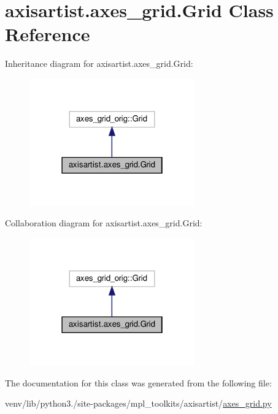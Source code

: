 \hypertarget{classaxisartist_1_1axes__grid_1_1Grid}{}\section{axisartist.\+axes\+\_\+grid.\+Grid Class Reference}
\label{classaxisartist_1_1axes__grid_1_1Grid}


Inheritance diagram for axisartist.\+axes\+\_\+grid.\+Grid\+:
\nopagebreak
\begin{figure}[H]
\begin{center}
\leavevmode
\includegraphics[width=202pt]{classaxisartist_1_1axes__grid_1_1Grid__inherit__graph}
\end{center}
\end{figure}


Collaboration diagram for axisartist.\+axes\+\_\+grid.\+Grid\+:
\nopagebreak
\begin{figure}[H]
\begin{center}
\leavevmode
\includegraphics[width=202pt]{classaxisartist_1_1axes__grid_1_1Grid__coll__graph}
\end{center}
\end{figure}


The documentation for this class was generated from the following file\+:\begin{DoxyCompactItemize}
\item 
venv/lib/python3./site-\/packages/mpl\+\_\+toolkits/axisartist/\hyperlink{axisartist_2axes__grid_8py}{axes\+\_\+grid.\+py}\end{DoxyCompactItemize}

